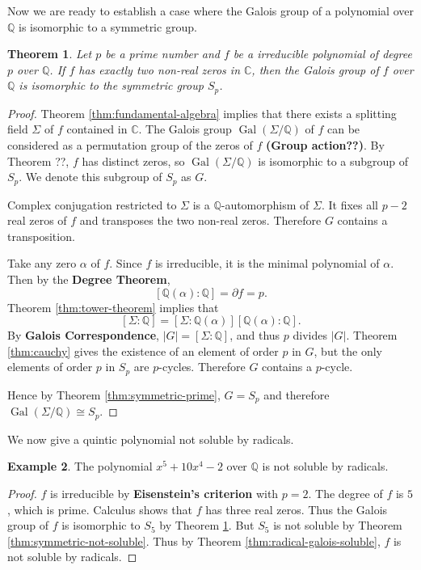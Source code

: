 \documentclass[12pt]{article}
\newtheorem{theorem}{Theorem}
\theoremstyle{definition}
\newtheorem{example}[theorem]{Example}
\newcommand{\Gal}{\operatorname{Gal}}
\begin{document}
Now we are ready to establish a case where the Galois group of a polynomial over $\mathbb Q$ is isomorphic to a symmetric group.

\begin{theorem} \label{thm:galois-iso-symmetric}
    Let $p$ be a prime number and $f$ be a irreducible polynomial of degree $p$ over $\mathbb Q$. If $f$ has exactly two non-real zeros in $\mathbb C$, then the Galois group of $f$ over $\mathbb Q$ is isomorphic to the symmetric group $S_p$.
\end{theorem}

\begin{proof}
    Theorem \ref{thm:fundamental-algebra} implies that there exists a splitting field $\Sigma $ of $f$ contained in $\mathbb C$. The Galois group $\Gal(\Sigma / \mathbb Q)$ of $f$ can be considered as a permutation group of the zeros of $f$ \textbf{(Group action??)}. By Theorem ??, $f$ has distinct zeros, so $\Gal(\Sigma / \mathbb Q)$ is isomorphic to a subgroup of $S_p$. We denote this subgroup of $S_p$ as $G$. 

    Complex conjugation restricted to $\Sigma$ is a $\mathbb Q$-automorphism of $\Sigma$. It fixes all $p - 2$ real zeros of $f$ and transposes the two non-real zeros. Therefore $G$ contains a transposition. 

    Take any zero $\alpha$ of $f$. Since $f$ is irreducible, it is the minimal polynomial of $\alpha$. Then by the \textbf{Degree Theorem}, $$[\mathbb Q(\alpha) : \mathbb Q] = \partial f = p. $$ Theorem \ref{thm:tower-theorem} implies that $$[\Sigma : \mathbb Q] = [\Sigma : \mathbb Q(\alpha)] [ \mathbb Q(\alpha) : \mathbb Q]. $$ By \textbf{Galois Correspondence}, $|G| = [\Sigma : \mathbb Q]$, and thus $p$ divides $|G|$. Theorem \ref{thm:cauchy} gives the existence of an element of order $p$ in $G$, but the only elements of order $p$ in $S_p$ are $p$-cycles. Therefore $G$ contains a $p$-cycle.

    Hence by Theorem \ref{thm:symmetric-prime}, $ G = S_p$ and therefore $\Gal(\Sigma / \mathbb Q) \cong S_p$.
\end{proof}

We now give a quintic polynomial not soluble by radicals. 

\begin{example}
    The polynomial $x^5 + 10 x^4 - 2$ over $\mathbb Q$ is not soluble by radicals.
\end{example}

\begin{proof}
    $f$ is irreducible by \textbf{Eisenstein's criterion} with $p = 2$. The degree of $f$ is $5$, which is prime. Calculus shows that $f$ has three real zeros. Thus the Galois group of $f$ is isomorphic to $S_5$ by Theorem \ref{thm:galois-iso-symmetric}. But $S_5$ is not soluble by Theorem \ref{thm:symmetric-not-soluble}. Thus by Theorem \ref{thm:radical-galois-soluble}, $f$ is not soluble by radicals.
\end{proof}
\end{document}
